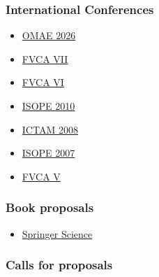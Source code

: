 \separator
\subsubsection{International Conferences}

  \begin{itemize}

    \item[$\blacktriangleright$] \href{https://event.asme.org/OMAE/About/OMAE-2026/}%
    {OMAE 2026}
  
    \item[$\blacktriangleright$] \href{http://www.wias-berlin.de/workshops/fvca7/}%
    {FVCA VII}
    
    \item[$\blacktriangleright$] \href{http://fvca6.fs.cvut.cz/}%
    {FVCA VI}
    
    \item[$\blacktriangleright$] \href{http://www.isope2010.org/}%
    {ISOPE 2010}
    
    \item[$\blacktriangleright$] \href{http://ictam2008.adelaide.edu.au/}%
    {ICTAM 2008}
    
    \item[$\blacktriangleright$] \href{http://www.isope.org/conferences/conferences.htm}%
    {ISOPE 2007}
    
    \item[$\blacktriangleright$] \href{http://www.latp.univ-mrs.fr/fvca5/}%
    {FVCA V}
    
  \end{itemize}

\separator
\subsubsection{Book proposals}

  \begin{itemize}
    \item[$\blacktriangleright$] \href{http://www.springer.com/}{Springer Science}
  \end{itemize}

\separator
\subsubsection{Calls for proposals}

